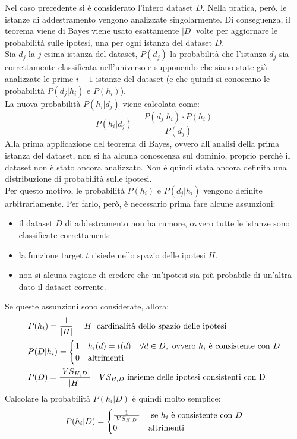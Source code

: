 Nel caso precedente si è considerato l'intero dataset $D$. Nella pratica, però, le istanze di addestramento vengono analizzate singolarmente.
Di conseguenza, il teorema viene di Bayes viene usato esattamente $|D|$ volte per aggiornare le probabilità sulle ipotesi, una per ogni istanza del dataset $D$.\\
Sia $d_j$ la $j$-esima istanza del dataset, $P(d_j)$ la probabilità che l'istanza $d_j$ sia correttamente classificata nell'universo e supponendo che siano state già analizzate le prime $i-1$ istanze del dataset (e che quindi si conoscano le probabilità $P(d_j | h_i)$ e $P(h_i)$).\\
La nuova probabilità $P(h_i | d_j)$ viene calcolata come:
\[
    P(h_i | d_j) = \frac{P(d_j | h_i) \cdot P(h_i)}{P(d_j)}
\]
Alla prima applicazione del teorema di Bayes, ovvero all'analisi della prima istanza del dataset, non si ha alcuna conoscenza sul dominio, proprio perchè il dataset non è stato ancora analizzato. Non è quindi stata ancora definita una distribuzione di probabilità sulle ipotesi.\\
Per questo motivo, le probabilità $P(h_i)$ e $P(d_j | h_i)$ vengono definite arbitrariamente. Per farlo, però, è necessario prima fare alcune assunzioni:
\begin{itemize}
    \item il dataset $D$ di addestramento non ha rumore, ovvero tutte le istanze sono classificate correttamente.
    \item la funzione target $t$ risiede nello spazio delle ipotesi $H$.
    \item non si alcuna ragione di credere che un'ipotesi sia più probabile di un'altra dato il dataset corrente.
\end{itemize}
Se queste assunzioni sono considerate, allora: 
\begin{align*}
    &P(h_i) = \frac{1}{|H|} \quad |H| \textnormal{ cardinalità dello spazio delle ipotesi}\\
    &P(D | h_i) = \begin{cases}
        1 & h_i(d) = t(d) \quad \forall d \in D, \textnormal{ ovvero $h_i$ è consistente con $D$}\\
        0 & \textnormal{altrimenti}
    \end{cases}\\
    &P(D) = \frac{|VS_{H,D}|}{|H|} \quad VS_{H,D} \textnormal{ insieme delle ipotesi consistenti con D}
\end{align*}
Calcolare la probabilità $P(h_i | D)$ è quindi molto semplice:
\begin{align*}
    P(h_i | D) = \begin{cases}
        \frac{1}{|VS_{H,D}|} & \textnormal{ se $h_i$ è consistente con $D$}\\
        0 & \textnormal{altrimenti}
    \end{cases}
\end{align*}

